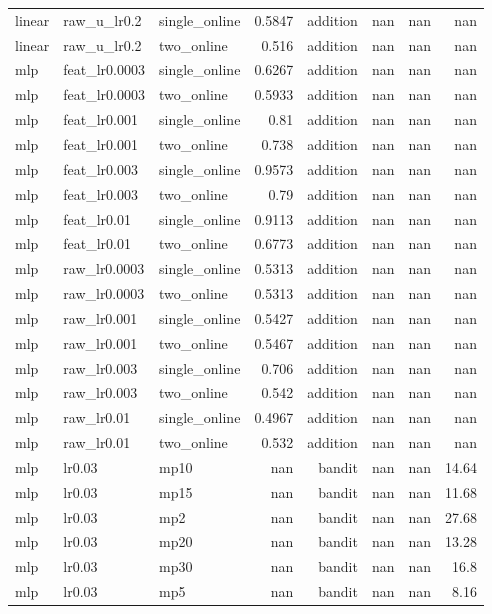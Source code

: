 \begin{table}[t]
\begin{tabular}{lllrrrrr}
linear & raw\_u\_lr0.2 & single\_online & 0.5847 & addition & nan & nan & nan \\
linear & raw\_u\_lr0.2 & two\_online & 0.516 & addition & nan & nan & nan \\
mlp & feat\_lr0.0003 & single\_online & 0.6267 & addition & nan & nan & nan \\
mlp & feat\_lr0.0003 & two\_online & 0.5933 & addition & nan & nan & nan \\
mlp & feat\_lr0.001 & single\_online & 0.81 & addition & nan & nan & nan \\
mlp & feat\_lr0.001 & two\_online & 0.738 & addition & nan & nan & nan \\
mlp & feat\_lr0.003 & single\_online & 0.9573 & addition & nan & nan & nan \\
mlp & feat\_lr0.003 & two\_online & 0.79 & addition & nan & nan & nan \\
mlp & feat\_lr0.01 & single\_online & 0.9113 & addition & nan & nan & nan \\
mlp & feat\_lr0.01 & two\_online & 0.6773 & addition & nan & nan & nan \\
mlp & raw\_lr0.0003 & single\_online & 0.5313 & addition & nan & nan & nan \\
mlp & raw\_lr0.0003 & two\_online & 0.5313 & addition & nan & nan & nan \\
mlp & raw\_lr0.001 & single\_online & 0.5427 & addition & nan & nan & nan \\
mlp & raw\_lr0.001 & two\_online & 0.5467 & addition & nan & nan & nan \\
mlp & raw\_lr0.003 & single\_online & 0.706 & addition & nan & nan & nan \\
mlp & raw\_lr0.003 & two\_online & 0.542 & addition & nan & nan & nan \\
mlp & raw\_lr0.01 & single\_online & 0.4967 & addition & nan & nan & nan \\
mlp & raw\_lr0.01 & two\_online & 0.532 & addition & nan & nan & nan \\
mlp & lr0.03 & mp10 & nan & bandit & nan & nan & 14.64 \\
mlp & lr0.03 & mp15 & nan & bandit & nan & nan & 11.68 \\
mlp & lr0.03 & mp2 & nan & bandit & nan & nan & 27.68 \\
mlp & lr0.03 & mp20 & nan & bandit & nan & nan & 13.28 \\
mlp & lr0.03 & mp30 & nan & bandit & nan & nan & 16.8 \\
mlp & lr0.03 & mp5 & nan & bandit & nan & nan & 8.16 \\

\end{tabular}
\end{table}
